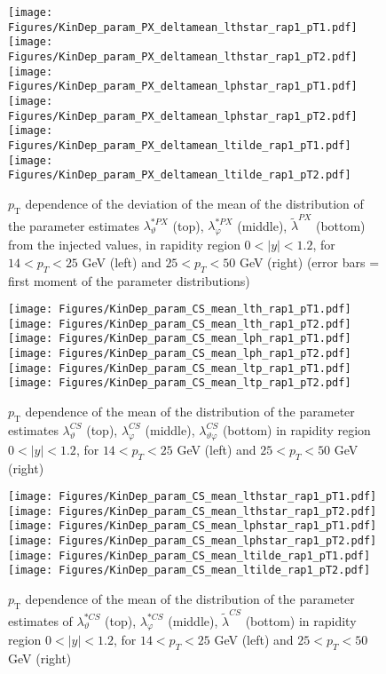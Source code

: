 \documentclass[12pt]{article}
\newcommand{\pT}{p_\mathrm{T}}
\newcommand{\absy}{\left |  y \right |}
\newcommand{\lamthCS}{\lambda^{\scriptscriptstyle CS}_\vartheta}
\newcommand{\lamphCS}{\lambda^{\scriptscriptstyle CS}_\varphi}
\newcommand{\lamthphCS}{\lambda^{\scriptscriptstyle CS}_{\vartheta \varphi}}
\newcommand{\lamtildeCS}{\tilde{\lambda}^{\scriptscriptstyle CS}}
\newcommand{\lamthstarCS}{\lambda^{* \scriptscriptstyle CS}_\vartheta}
\newcommand{\lamphstarCS}{\lambda^{* \scriptscriptstyle CS}_\varphi}
\newcommand{\lamtildePX}{\tilde{\lambda}^{\scriptscriptstyle PX}}
\newcommand{\lamthstarPX}{\lambda^{* \scriptscriptstyle PX}_\vartheta}
\newcommand{\lamphstarPX}{\lambda^{* \scriptscriptstyle PX}_\varphi}
\begin{document}
\begin{figure}[htbp]
\centering
\texttt{[image: Figures/KinDep\_param\_PX\_deltamean\_lthstar\_rap1\_pT1.pdf]}
\texttt{[image: Figures/KinDep\_param\_PX\_deltamean\_lthstar\_rap1\_pT2.pdf]}
\texttt{[image: Figures/KinDep\_param\_PX\_deltamean\_lphstar\_rap1\_pT1.pdf]}
\texttt{[image: Figures/KinDep\_param\_PX\_deltamean\_lphstar\_rap1\_pT2.pdf]}
\texttt{[image: Figures/KinDep\_param\_PX\_deltamean\_ltilde\_rap1\_pT1.pdf]}
\texttt{[image: Figures/KinDep\_param\_PX\_deltamean\_ltilde\_rap1\_pT2.pdf]}
\caption{$\pT$ dependence of the deviation of the mean of the distribution of
the parameter estimates $\lamthstarPX$ (top), $\lamphstarPX$ (middle),
$\lamtildePX$ (bottom) from the injected values, in rapidity region $0<\absy<1.2$, for $14 < p_T < 25$ GeV (left) and
$25 < p_T < 50$ GeV (right) (error bars = first moment of
the parameter distributions)}
\end{figure}
\clearpage










\begin{figure}[htbp]
\centering
\texttt{[image: Figures/KinDep\_param\_CS\_mean\_lth\_rap1\_pT1.pdf]}
\texttt{[image: Figures/KinDep\_param\_CS\_mean\_lth\_rap1\_pT2.pdf]}
\texttt{[image: Figures/KinDep\_param\_CS\_mean\_lph\_rap1\_pT1.pdf]}
\texttt{[image: Figures/KinDep\_param\_CS\_mean\_lph\_rap1\_pT2.pdf]}
\texttt{[image: Figures/KinDep\_param\_CS\_mean\_ltp\_rap1\_pT1.pdf]}
\texttt{[image: Figures/KinDep\_param\_CS\_mean\_ltp\_rap1\_pT2.pdf]}
\caption{$\pT$ dependence of the mean of the distribution of the parameter estimates $\lamthCS$ (top), $\lamphCS$ (middle), $\lamthphCS$ (bottom) in rapidity region $0<\absy<1.2$, for $14 < p_T < 25$ GeV (left) and
$25 < p_T < 50$ GeV (right)}
\end{figure}
\clearpage

\begin{figure}[htbp]
\centering
\texttt{[image: Figures/KinDep\_param\_CS\_mean\_lthstar\_rap1\_pT1.pdf]}
\texttt{[image: Figures/KinDep\_param\_CS\_mean\_lthstar\_rap1\_pT2.pdf]}
\texttt{[image: Figures/KinDep\_param\_CS\_mean\_lphstar\_rap1\_pT1.pdf]}
\texttt{[image: Figures/KinDep\_param\_CS\_mean\_lphstar\_rap1\_pT2.pdf]}
\texttt{[image: Figures/KinDep\_param\_CS\_mean\_ltilde\_rap1\_pT1.pdf]}
\texttt{[image: Figures/KinDep\_param\_CS\_mean\_ltilde\_rap1\_pT2.pdf]}
\caption{$\pT$ dependence of the mean of the distribution of the parameter estimates of $\lamthstarCS$ (top), $\lamphstarCS$ (middle), $\lamtildeCS$ (bottom) in rapidity region $0<\absy<1.2$, for $14 < p_T < 25$ GeV (left) and
$25 < p_T < 50$ GeV (right)}
\end{figure}
\clearpage
\end{document}
